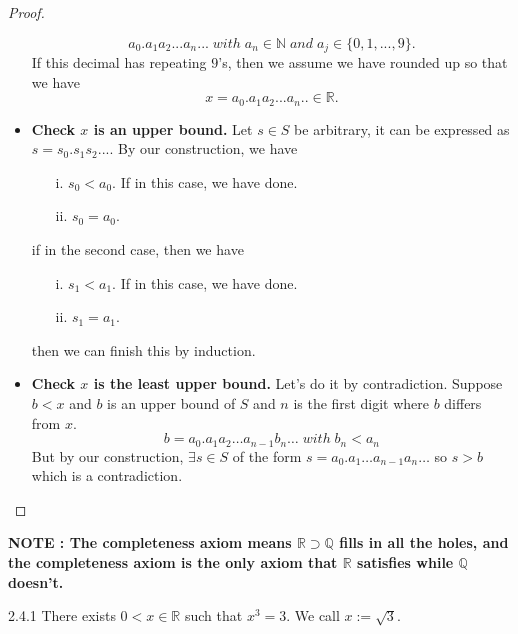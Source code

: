 \documentclass[a4paper]{article}
\def\rr{{\mathbb R}}
\def\qq{{\mathbb Q}}
\def\nn{{\mathbb N}}
\begin{document}
\begin{proof}
\begin{itemize}
            \begin{equation*}
                a_0.a_1a_2...a_n... \; with \; a_n\in \nn \; and \; a_j\in \{0,1,...,9\}.
            \end{equation*}
            If this decimal has repeating $9$'s, then we assume we have rounded up so that we have
            \begin{equation*}
                x=a_0.a_1a_2...a_n..\in \rr.
            \end{equation*}
        \item \textbf{Check $x$ is an upper bound.} Let $s\in S$ be arbitrary, it can be expressed as $s=s_0.s_1s_2...$. By our construction, we have
         \begin{enumerate}
            \item[i.] $s_0<a_0$. If in this case, we have done.
            \item[ii.] $s_0=a_0$.
         \end{enumerate}
         if in the second case, then we have
         \begin{enumerate}
            \item[i.] $s_1<a_1$. If in this case, we have done.
            \item[ii.] $s_1=a_1$. 
         \end{enumerate}
         then we can finish this by induction.
        \item \textbf{Check $x$ is the least upper bound.} Let's do it by contradiction. Suppose $b<x$ and $b$ is an upper bound of $S$ and $n$ is the first digit where $b$ differs from $x$.
              \begin{equation*}
                b=a_0.a_1a_2\ldots a_{n-1}b_n\ldots \; with \; b_n<a_n
              \end{equation*}
        But by our construction, $\exists s\in S$ of the form $s=a_0.a_1\ldots a_{n-1}a_n\ldots $ so $s>b$ which is a contradiction.
    \end{itemize}
\end{proof}
\textbf{NOTE : The completeness axiom means $\rr \supset \qq$ fills in all the holes, and the completeness axiom is the only axiom that $\rr$ satisfies while $\qq$ doesn't.} 
\begin{proposition}{2.4.1}{}
    There exists $0<x\in \mathbb{R}$ such that $x^3=3$. We call $x:=\sqrt{3}$.
\end{proposition}
\end{document}

